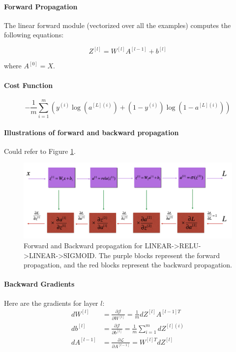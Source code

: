 \paragraph{Forward Propagation}
The linear forward module (vectorized over all the examples) computes the following equations:

\begin{equation}
    Z^{[l]} = W^{[l]}A^{[l-1]} + b^{[l]}
\end{equation}

where $A^{[0]} = X$.

\paragraph{Cost Function}
\begin{equation}
    -\frac{1}{m} \sum_{i=1}^{m}\left(y^{(i)} \log \left(a^{[L](i)}\right)+\left(1-y^{(i)}\right) \log \left(1-a^{[L](i)}\right)\right)
\end{equation}

\paragraph{Illustrations of forward and backward propagation} Could refer to Figure \ref{backprop-kiank}.

\begin{figure}[!htbp]
    \centering 
    \includegraphics[width=1.0\textwidth, trim={0 0 0 0}, clip]{img/c1/backprop_kiank.png}
    \caption{Forward and Backward propagation for LINEAR->RELU->LINEAR->SIGMOID. The purple blocks represent the forward propagation, and the red blocks represent the backward propagation.}
    \label{backprop-kiank}
\end{figure}

\paragraph{Backward Gradients}
Here are the gradients for layer $l$:
\begin{equation}
\begin{aligned}
d W^{[l]} &=\frac{\partial \mathcal{J}}{\partial W^{[l]}}=\frac{1}{m} d Z^{[l]} A^{[l-1] T} \\
d b^{[l]} &=\frac{\partial \mathcal{J}}{\partial b^{[l]}}=\frac{1}{m} \sum_{i=1}^{m} d Z^{[l](i)} \\
d A^{[l-1]} &=\frac{\partial \mathcal{L}}{\partial A^{[l-1]}}=W^{[l] T} d Z^{[l]}
\end{aligned}
\end{equation}

